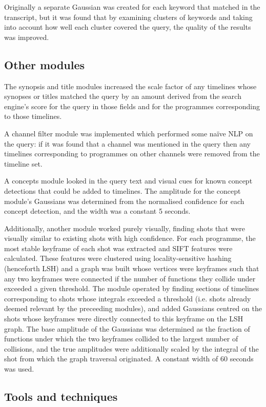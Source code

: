 \documentclass{../acm_proc_article-me11_tweaked}
\begin{document}
Originally a separate Gaussian was created for each keyword that matched in 
the transcript, but it was found that by examining clusters of keywords and 
taking into account how well each cluster covered the query, the quality of 
the results was improved.

\subsection{Other modules}
The synopsis and title modules increased the scale factor of any timelines 
whose synopses or titles matched the query by an amount derived from the 
search engine's score for the query in those fields and for the programmes 
corresponding to those timelines.

A channel filter module was implemented which performed some naïve NLP on the 
query: if it was found that a channel was mentioned in the query then any 
timelines corresponding to programmes on other channels were removed from the 
timeline set.

A concepts module looked in the query text and visual cues for known concept 
detections that could be added to timelines. The amplitude for the concept 
module's Gaussians was determined from the normalised confidence for each 
concept detection, and the width was a constant 5 seconds.

Additionally, another module worked purely visually, finding shots that were 
visually similar to existing shots with high confidence. For each programme, 
the most stable keyframe of each shot was extracted and SIFT features were 
calculated. These features were clustered using locality-sensitive hashing 
(henceforth LSH) and a graph was built whose vertices were keyframes such that 
any two keyframes were connected if the number of functions they collide under 
exceeded a given threshold. The module operated by finding sections of 
timelines corresponding to shots whose integrals exceeded a threshold (i.e. 
shots already deemed relevant by the preceeding modules), and added Gaussians 
centred on the shots whose keyframes were directly connected to this keyframe 
on the LSH graph. The base amplitude of the Gaussians was determined as the 
fraction of functions under which the two keyframes collided to the largest 
number of collisions, and the true amplitudes were additionally scaled by the 
integral of the shot from which the graph traversal originated. A constant 
width of 60 seconds was used.

\subsection{Tools and techniques}
\end{document}
